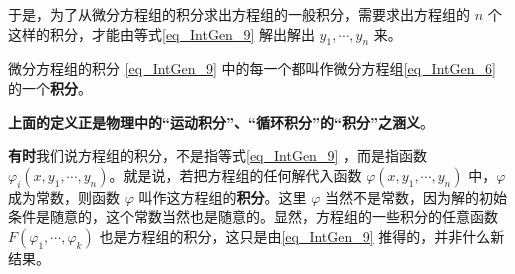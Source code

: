 于是，为了从微分方程组的积分求出方程组的一般积分，需要求出方程组的 $n$ 个这样的积分，才能由等式\autoref{eq_IntGen_9} 解出解出 $y_1,\cdots,y_n$ 来。
\begin{definition}{微分方程组的积分}\label{def_IntGen_1}
\autoref{eq_IntGen_9} 中的每一个都叫作微分方程组\autoref{eq_IntGen_6} 的一个\textbf{积分}。
\end{definition}
\textbf{上面的定义正是物理中的“运动积分”、“循环积分”的“积分”之涵义}。

\textbf{有时}我们说方程组的积分，不是指等式\autoref{eq_IntGen_9} ，而是指函数 $\varphi_i(x,y_1,\cdots,y_n)$。就是说，若把方程组的任何解代入函数 $\varphi(x,y_1,\cdots,y_n)$ 中，$\varphi$ 成为常数，则函数 $\varphi$ 叫作这方程组的\textbf{积分}。这里 $\varphi$ 当然不是常数，因为解的初始条件是随意的，这个常数当然也是随意的。显然，方程组的一些积分的任意函数 $F(\varphi_1,\cdots,\varphi_k)$ 也是方程组的积分，这只是由\autoref{eq_IntGen_9} 推得的，并非什么新结果。
